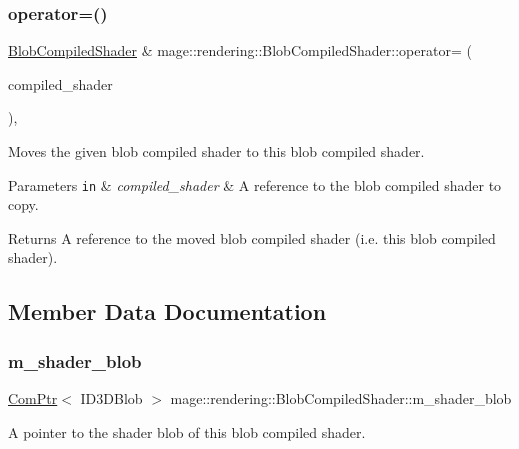 \subsubsection{\texorpdfstring{operator=()}{operator=()}\hspace{0.1cm}{\footnotesize\ttfamily [2/2]}}
{\footnotesize\ttfamily \mbox{\hyperlink{classmage_1_1rendering_1_1_blob_compiled_shader}{Blob\+Compiled\+Shader}} \& mage\+::rendering\+::\+Blob\+Compiled\+Shader\+::operator= (\begin{DoxyParamCaption}\item[{\mbox{\hyperlink{classmage_1_1rendering_1_1_blob_compiled_shader}{Blob\+Compiled\+Shader}} \&\&}]{compiled\+\_\+shader }\end{DoxyParamCaption})\hspace{0.3cm}{\ttfamily [default]}, {\ttfamily [noexcept]}}

Moves the given blob compiled shader to this blob compiled shader.


\begin{DoxyParams}[1]{Parameters}
\mbox{\tt in}  & {\em compiled\+\_\+shader} & A reference to the blob compiled shader to copy. \\
\hline
\end{DoxyParams}
\begin{DoxyReturn}{Returns}
A reference to the moved blob compiled shader (i.\+e. this blob compiled shader). 
\end{DoxyReturn}


\subsection{Member Data Documentation}
\mbox{\label{classmage_1_1rendering_1_1_blob_compiled_shader_ad28d77dc5fd97d127c2e2dc875384449}} 
\subsubsection{\texorpdfstring{m\+\_\+shader\+\_\+blob}{m\_shader\_blob}}
{\footnotesize\ttfamily \mbox{\hyperlink{namespacemage_ae74f374780900893caa5555d1031fd79}{Com\+Ptr}}$<$ I\+D3\+D\+Blob $>$ mage\+::rendering\+::\+Blob\+Compiled\+Shader\+::m\+\_\+shader\+\_\+blob\hspace{0.3cm}{\ttfamily [private]}}

A pointer to the shader blob of this blob compiled shader. 